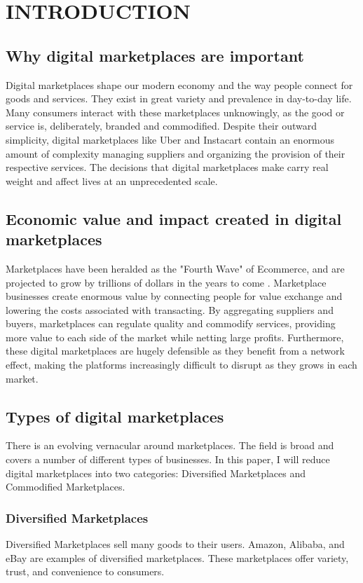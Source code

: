 \addchapheadtotoc
\chapter{INTRODUCTION}

\section{Why digital marketplaces are important}
Digital marketplaces shape our modern economy and the way people connect for goods and services. They exist in great variety and prevalence in day-to-day life. Many consumers interact with these marketplaces unknowingly, as the good or service is, deliberately, branded and commodified. Despite their outward simplicity, digital marketplaces like Uber and Instacart contain an enormous amount of complexity managing suppliers and organizing the provision of their respective services. The decisions that digital marketplaces make carry real weight and affect lives at an unprecedented scale.

\section{Economic value and impact created in digital marketplaces}
Marketplaces have been heralded as the "Fourth Wave" of Ecommerce, and are projected to grow by trillions of dollars in the years to come \citep{marketplaceBoom}. Marketplace businesses create enormous value by connecting people for value exchange and lowering the costs associated with transacting. By aggregating suppliers and buyers, marketplaces can regulate quality and commodify services, providing more value to each side of the market while netting large profits. Furthermore, these digital marketplaces are hugely defensible as they benefit from a network effect, making the platforms increasingly difficult to disrupt as they grows in each market.

\section{Types of digital marketplaces}

There is an evolving vernacular around marketplaces. The field is broad and covers a number of different types of businesses. In this paper, I will reduce digital marketplaces into two categories: Diversified Marketplaces and Commodified Marketplaces. 

\subsection{Diversified Marketplaces}
Diversified Marketplaces sell many goods to their users. Amazon, Alibaba, and eBay are examples of diversified marketplaces. These marketplaces offer variety, trust, and convenience to consumers.

